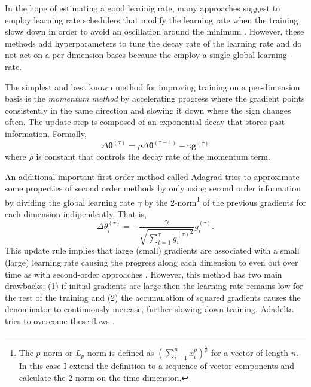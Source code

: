In the hope of estimating a good learinig rate, many approaches suggest to employ learning rate schedulers that modify the learning rate when the training slows down in order to avoid an oscillation around the minimum \citep{Goodfellow2016,Nocedal2006NumericalOptimization}. However, these methods add hyperparameters to tune the decay rate of the learning rate and do not act on a per-dimension bases because the employ a single global learning-rate.

The simplest and best known method for improving training on a per-dimension basis is the \textit{momentum method} \citep{Qian1999OnAlgorithms} by accelerating progress where the gradient points consistently in the same direction and slowing it down where the sign changes often. The update step is composed of an exponential decay that stores past information. Formally,
\begin{equation} \label{eq:momentum}
    \Delta \bm{\theta}^{(\tau)} = \rho \Delta \bm{\theta}^{(\tau-1)} - \gamma \bm{g}^{(\tau)}
\end{equation}
where $\rho$ is constant that controls the decay rate of the momentum term.

An additional important first-order method called Adagrad \citep{Duchi2011AdaptiveOptimization} tries to approximate some properties of second order methods by only using second order information \citep{Zeiler2012ADADELTA:Method} by dividing the global learning rate $\gamma$ by the 2-norm\footnote{\label{note:pnorm}The $p$-norm or $L_p$-norm is defined as $(\sum_{i=1}^n x_i^p)^{\frac{1}{p}}$ for a vector of length $n$. In this case I extend the definition to a sequence of vector components and calculate the 2-norm on the time dimension.} of the previous gradients for each dimension indipendently. That is,
\begin{equation} \label{eq:adagrad}
    \Delta \theta^{(\tau)}_i = - \dfrac{\gamma}{\sqrt{\sum_{t=1}^\tau {g^{(\tau)}_i}^2}} g^{(\tau)}_i.
\end{equation}
This update rule implies that large (small) gradients are associated with a small (large) learning rate causing the progress along each dimension to even out over time as with second-order approaches \citep{Zeiler2012ADADELTA:Method}. However, this method has two main drawbacks: (1) if initial gradients are large then the learning rate remains low for the rest of the training and (2) the accumulation of squared gradients causes the denominator to continuously increase, further slowing down training. Adadelta tries to overcome these flaws \citep{Zeiler2012ADADELTA:Method}.
\\

